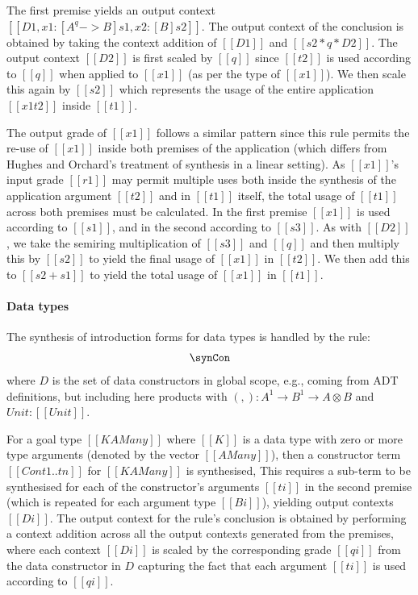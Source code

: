 The first premise yields an output context
$[[ D1, x1 : [ A ^ q -> B ] s1, x2 : [B] s2 ]]$.
The output context of the conclusion is obtained by taking the context addition of
$[[ D1 ]]$ and $[[ s2 * {q * D2} ]]$. The output context $[[ D2 ]]$ is first scaled by
$[[ q ]]$ since $[[ t2 ]]$ is used according to $[[ q ]]$ when applied to
$[[ x1 ]]$ (as per the type of $[[ x1 ]]$). We then scale this again by $[[ s2 ]]$
which represents the usage of the entire application $[[ x1 t2 ]]$ inside
$[[ t1 ]]$.

The output grade of $[[ x1 ]]$ follows a similar pattern
since this rule permits the re-use of
$[[ x1 ]]$ inside both premises of the application (which
differs from Hughes and Orchard's treatment of synthesis in a linear setting).
As $[[ x1 ]]$'s input grade $[[ r1 ]]$ may permit multiple uses both inside the
synthesis of the application argument $[[ t2 ]]$ and in $[[ t1 ]]$ itself, the
total usage of $[[ t1 ]]$ across both premises must be calculated. In the first
premise $[[ x1 ]]$ is used according to $[[ s1 ]]$, and in the second according
to $[[ s3 ]]$. As with $[[ D2 ]]$, we take the semiring multiplication of $[[ s3 ]]$ and $[[ q ]]$ and then
multiply this by $[[ s2 ]]$ to yield the final usage of $[[ x1 ]]$ in $[[ t2 ]]$.
We then add this to $[[ s2 + s1 ]]$ to yield the total usage of $[[ x1 ]]$ in
$[[ t1 ]]$.

\paragraph{Data types}

The synthesis of introduction forms for data types is handled by the \GRANULEdruleConName rule:
\begin{align*}
    \synCon
\end{align*}
where $D$ is the set of data constructors in global scope, e.g., coming from
ADT definitions, but including here products with $(,) : A^1 \rightarrow B^1 \rightarrow A \otimes B$
and $Unit : [[ Unit ]]$.

For a goal type $[[ K {A Many} ]]$ where $[[ K ]]$ is a data type
with zero or more type arguments (denoted by the vector $[[ A Many ]]$), then
a constructor term $[[ Con t1 .. tn ]]$ for $[[ K {A Many} ]]$ is synthesised,
This requires a sub-term to
be synthesised for each of the constructor's arguments $[[ ti ]]$ in
the second premise (which is repeated for each argument type $[[ Bi ]]$), yielding
output contexts $[[ Di ]]$.
The output context for the rule's conclusion is obtained by performing a context
addition across all the output contexts generated from the premises, where each
context $[[ Di ]]$ is scaled by the corresponding grade $[[ qi ]]$ from the data
constructor in $D$ capturing the fact that each argument $[[ ti ]]$ is used
according to $[[ qi ]]$.

